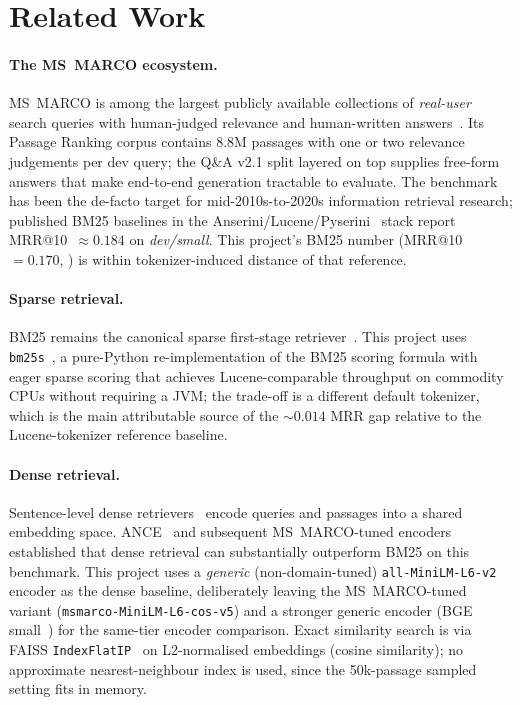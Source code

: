\documentclass[11pt,a4paper]{article}
\makeatletter
\newcommand{\dataset}{MS~MARCO}
\newcommand{\devsmall}{\textit{dev/small}}
\newcommand{\msmarco}{MS~MARCO}
\newcommand{\mrr}{MRR@10}
\newcommand{\bmtwofive}{BM25}
\makeatother
\begin{document}
\clearpage\section{Related Work}
\label{sec:relwork}

\paragraph{The \dataset{} ecosystem.}  \dataset{} is among the
largest publicly available collections of \emph{real-user} search
queries with human-judged relevance and human-written
answers~\cite{bajaj2016msmarco,nguyen2016msmarcoqa}.  Its Passage
Ranking corpus contains 8.8M passages with one or two relevance
judgements per dev query; the Q\&A v2.1 split layered on top supplies
free-form answers that make end-to-end generation tractable to
evaluate.  The benchmark has been the de-facto target for
mid-2010s-to-2020s information retrieval research; published
\bmtwofive{} baselines in the
Anserini/Lucene/Pyserini~\cite{lin2021pyserini} stack report
\mrr{}~$\approx 0.184$ on \devsmall{}.  This project's \bmtwofive{}
number (\mrr{}~$=0.170$, ) is within tokenizer-induced
distance of that reference.

\paragraph{Sparse retrieval.}  \bmtwofive{} remains the canonical
sparse first-stage retriever~\cite{robertson2009bm25}.  This project
uses \texttt{bm25s}~\cite{lu2024bm25s}, a pure-Python re-implementation
of the BM25 scoring formula with eager sparse scoring that achieves
Lucene-comparable throughput on commodity CPUs without requiring a
JVM; the trade-off is a different default tokenizer, which is the
main attributable source of the $\sim\!0.014$ MRR gap relative to
the Lucene-tokenizer reference baseline.

\paragraph{Dense retrieval.}  Sentence-level dense
retrievers~\cite{reimers2019sbert} encode queries and passages into a
shared embedding space.  ANCE~\cite{xiong2021ance} and subsequent
\msmarco{}-tuned encoders established that dense retrieval can
substantially outperform \bmtwofive{} on this benchmark.  This project
uses a \emph{generic} (non-domain-tuned)
\texttt{all-MiniLM-L6-v2}~\cite{wang2020minilm} encoder as the dense
baseline, deliberately leaving the \msmarco{}-tuned variant
(\texttt{msmarco-MiniLM-L6-cos-v5}) and a stronger generic encoder
(BGE small~\cite{xiao2024bge}) for the same-tier encoder comparison.  Exact
similarity search is via FAISS \texttt{IndexFlatIP}~\cite{johnson2019faiss}
on L2-normalised embeddings (cosine similarity); no approximate
nearest-neighbour index is used, since the
50k-passage sampled setting fits in memory.
\end{document}
